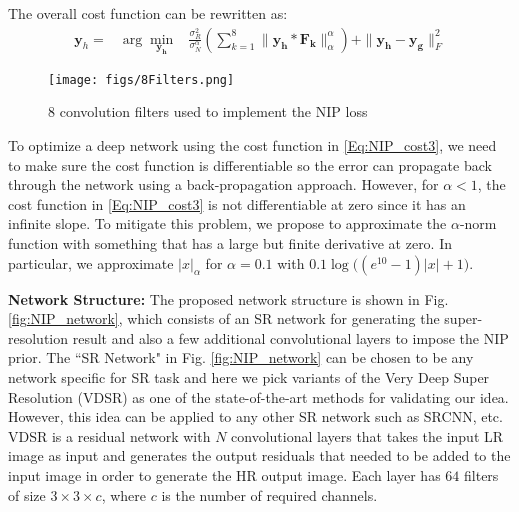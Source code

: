\documentclass[9pt]{article}
\newcommand{\vect}[1]{\pmb{#1}}
\newcommand{\mat}[1]{\pmb{#1}}
\def\bea{\begin{eqnarray}}
\def\eea{\end{eqnarray}}
\begin{document}
The overall cost function can be rewritten as:
\bea
    \vect y_h = &\arg\min\limits_{\vect{y_h}}   &  \frac{\sigma_R^2}{\sigma_N^\alpha}  \left(\sum\limits_{k=1}^{8}   \|\mat{y_h} \ast \mat{F_k}  \|_\alpha^\alpha \right) +
                                    \| \mat{y_h}  - \mat{y_g} \|_F^2 \label{Eq:NIP_cost3}
\eea
\begin{figure}
  \centering
  \texttt{[image: figs/8Filters.png]}\vspace{-0.15in}
  \caption{ 8 convolution filters used to implement the NIP loss}
  \label{Fig:Filters}
\end{figure}
To optimize a deep network using the cost function in \eqref{Eq:NIP_cost3}, we need to make sure the cost function is differentiable so the error can propagate back through the network using a back-propagation approach. However, for $\alpha <1$, the cost function in \eqref{Eq:NIP_cost3} is not differentiable at zero since it has an infinite slope. %
To mitigate this problem, we propose to approximate the $\alpha$-norm function with something that has a large but finite derivative at zero. In particular,  we approximate $|x|_\alpha$ for $\alpha=0.1$ with $0.1 \log\Big((e^{10}-1)|x|+1\Big)$. %





\textbf{Network Structure:} The proposed network structure is shown in Fig. \ref{fig:NIP_network}, which consists of an SR network for generating the super-resolution result and also a few additional convolutional layers to impose the NIP prior.
The ``SR Network" in Fig. \ref{fig:NIP_network} can be chosen to be any network specific for SR task and here we pick variants of the Very Deep Super Resolution (VDSR) \cite{Kim_2016_VDSR} as one of the state-of-the-art methods for validating our idea. However, this idea can be applied to any other SR network such as SRCNN, etc. VDSR  is a residual network with $N$ convolutional layers that takes the input LR image as input and generates the output residuals that needed to be added to the input image in order to generate the HR output image. Each layer has $64$ filters of size $3\times 3\times c$, where $c$ is the number of required channels.
\end{document}
